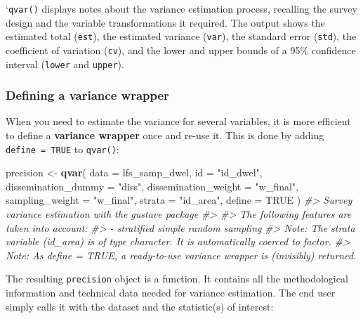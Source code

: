 \documentclass[
]{article}
\newenvironment{Shaded}{\begin{snugshade}}{\end{snugshade}}
\newcommand{\AttributeTok}[1]{\textcolor[rgb]{0.13,0.29,0.53}{#1}}
\newcommand{\CommentTok}[1]{\textcolor[rgb]{0.56,0.35,0.01}{\textit{#1}}}
\newcommand{\ConstantTok}[1]{\textcolor[rgb]{0.56,0.35,0.01}{#1}}
\newcommand{\FunctionTok}[1]{\textcolor[rgb]{0.13,0.29,0.53}{\textbf{#1}}}
\newcommand{\NormalTok}[1]{#1}
\newcommand{\OtherTok}[1]{\textcolor[rgb]{0.56,0.35,0.01}{#1}}
\newcommand{\StringTok}[1]{\textcolor[rgb]{0.31,0.60,0.02}{#1}}
\begin{document}
`\texttt{qvar()} displays notes about the variance estimation process,
recalling the survey design and the variable transformations it
required. The output shows the estimated total (\texttt{est}), the
estimated variance (\texttt{var}), the standard error (\texttt{std}),
the coefficient of variation (\texttt{cv}), and the lower and upper
bounds of a 95\% confidence interval (\texttt{lower} and
\texttt{upper}).

\subsubsection{Defining a variance
wrapper}\label{defining-a-variance-wrapper}

When you need to estimate the variance for several variables, it is more
efficient to define a \textbf{variance wrapper} once and re-use it. This
is done by adding \texttt{define\ =\ TRUE} to \texttt{qvar()}:

\begin{Shaded}
\begin{Highlighting}[]
\NormalTok{precision }\OtherTok{\textless{}{-}} \FunctionTok{qvar}\NormalTok{(}
  \AttributeTok{data =}\NormalTok{ lfs\_samp\_dwel,}
  \AttributeTok{id =} \StringTok{"id\_dwel"}\NormalTok{,}
  \AttributeTok{dissemination\_dummy  =} \StringTok{"diss"}\NormalTok{,}
  \AttributeTok{dissemination\_weight =} \StringTok{"w\_final"}\NormalTok{,}
  \AttributeTok{sampling\_weight =} \StringTok{"w\_final"}\NormalTok{,}
  \AttributeTok{strata =} \StringTok{"id\_area"}\NormalTok{,}
  \AttributeTok{define =} \ConstantTok{TRUE}
\NormalTok{)}
\CommentTok{\#\textgreater{} Survey variance estimation with the gustave package}
\CommentTok{\#\textgreater{} }
\CommentTok{\#\textgreater{} The following features are taken into account:}
\CommentTok{\#\textgreater{}   {-} stratified simple random sampling}
\CommentTok{\#\textgreater{} Note: The strata variable (id\_area) is of type character. It is automatically coerced to factor.}
\CommentTok{\#\textgreater{} Note: As define = TRUE, a ready{-}to{-}use variance wrapper is (invisibly) returned.}
\end{Highlighting}
\end{Shaded}

The resulting \texttt{precision} object is a function. It contains all
the methodological information and technical data needed for variance
estimation. The end user simply calls it with the dataset and the
statistic(s) of interest:
\end{document}
